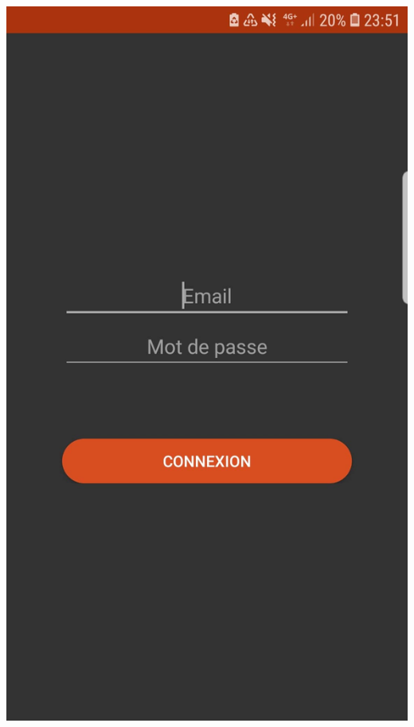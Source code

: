 \documentclass{article}
\begin{document}
\begin{center}
    \includegraphics[scale=0.1]{co.jpg}

\end{center}
\end{document}
